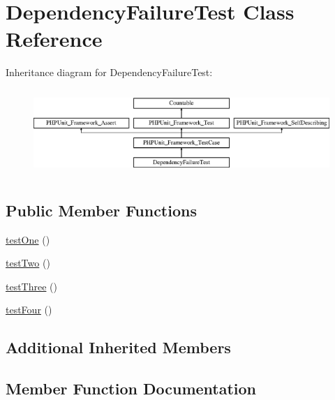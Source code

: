 \hypertarget{class_dependency_failure_test}{}\section{Dependency\+Failure\+Test Class Reference}
\label{class_dependency_failure_test}
Inheritance diagram for Dependency\+Failure\+Test\+:\begin{figure}[H]
\begin{center}
\leavevmode
\includegraphics[height=3.303835cm]{class_dependency_failure_test}
\end{center}
\end{figure}
\subsection*{Public Member Functions}
\begin{DoxyCompactItemize}
\item 
\mbox{\hyperlink{class_dependency_failure_test_afbf3ff88b322c6a7197ce02297cd23a0}{test\+One}} ()
\item 
\mbox{\hyperlink{class_dependency_failure_test_a4fb9974ce113d5d1db8075e0db0dc9b6}{test\+Two}} ()
\item 
\mbox{\hyperlink{class_dependency_failure_test_a0bd6c752e665cd0e690512ca38d15d41}{test\+Three}} ()
\item 
\mbox{\hyperlink{class_dependency_failure_test_a610ae959d988c18c588f47517f6a291f}{test\+Four}} ()
\end{DoxyCompactItemize}
\subsection*{Additional Inherited Members}


\subsection{Member Function Documentation}
\mbox{\label{class_dependency_failure_test_a610ae959d988c18c588f47517f6a291f}} 

